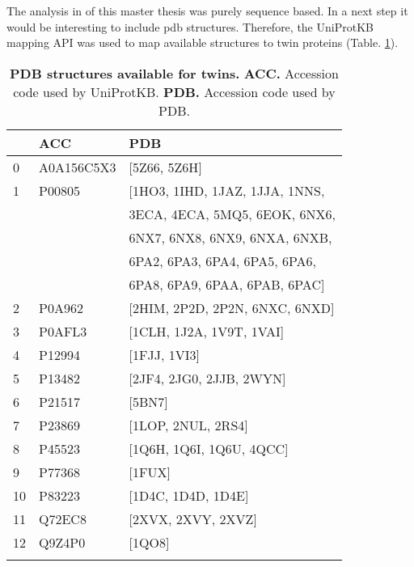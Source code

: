 The analysis in of this master thesis was purely sequence based.
In a next step it would be interesting to include pdb structures.
Therefore, the UniProtKB mapping API was used to map available structures to twin proteins (Table. \ref{table:structures}).

\newpage
\begin{longtable}[]{@{}lll@{}}
\toprule
& ACC & PDB\tabularnewline
\midrule
\endhead
0 & A0A156C5X3 & {[}5Z66, 5Z6H{]}\tabularnewline
1 & P00805 & {[}1HO3, 1IHD, 1JAZ, 1JJA, 1NNS, \tabularnewline
	& & 3ECA, 4ECA, 5MQ5, 6EOK, 6NX6, \tabularnewline
	& &6NX7, 6NX8, 6NX9, 6NXA, 6NXB, \tabularnewline
	& &6PA2, 6PA3, 6PA4, 6PA5, 6PA6, \tabularnewline
	& & 6PA8, 6PA9, 6PAA, 6PAB, 6PAC{]}\tabularnewline
2 & P0A962 & {[}2HIM, 2P2D, 2P2N, 6NXC, 6NXD{]}\tabularnewline
3 & P0AFL3 & {[}1CLH, 1J2A, 1V9T, 1VAI{]}\tabularnewline
4 & P12994 & {[}1FJJ, 1VI3{]}\tabularnewline
5 & P13482 & {[}2JF4, 2JG0, 2JJB, 2WYN{]}\tabularnewline
6 & P21517 & {[}5BN7{]}\tabularnewline
7 & P23869 & {[}1LOP, 2NUL, 2RS4{]}\tabularnewline
8 & P45523 & {[}1Q6H, 1Q6I, 1Q6U, 4QCC{]}\tabularnewline
9 & P77368 & {[}1FUX{]}\tabularnewline
10 & P83223 & {[}1D4C, 1D4D, 1D4E{]}\tabularnewline
11 & Q72EC8 & {[}2XVX, 2XVY, 2XVZ{]}\tabularnewline
12 & Q9Z4P0 & {[}1QO8{]}\tabularnewline
\bottomrule
\caption{\textbf{PDB structures available for twins.}
	\textbf{ACC.} Accession code used by UniProtKB.
	\textbf{PDB.} Accession code used by PDB.
}
\label{table:structures}
\end{longtable}


